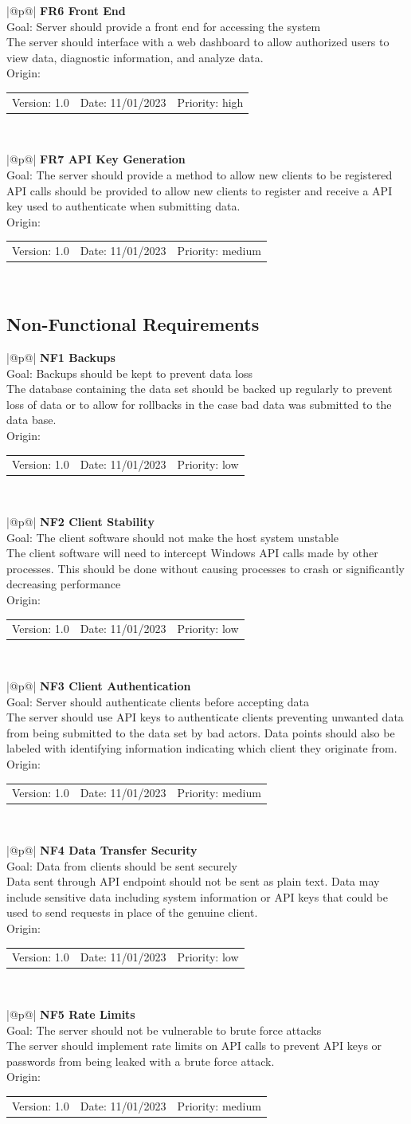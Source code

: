 \documentclass[titlepage]{article}
\makeatletter
\newcommand{\requirement}[7]
{
        \begin{table}[H]
            \centering
            \begin{tabular}{|@{}p{\textwidth}@{}|}
                \hline
                \textbf{#1} \\
                \hline
                Goal: #2 \\
                \hline
                #3 \\
                \hline
                Origin: #4 \\
                \hline
                \begin{tabular}{c|c|c}
                    Version: #5 & Date: #6 & Priority: #7\\
                \end{tabular}\\
            \hline
            \end{tabular}
        \end{table}
}
\makeatother
\begin{document}
\requirement
{FR6 Front End}
{Server should provide a front end for accessing the system}
{The server should interface with a web dashboard to allow authorized users to view data, diagnostic information, and analyze data.}
{}{1.0}{11/01/2023}{high}

\requirement
{FR7 API Key Generation}
{The server should provide a method to allow new clients to be registered}
{API calls should be provided to allow new clients to register and receive a API key used to authenticate when submitting data.}
{}{1.0}{11/01/2023}{medium}

\subsection{Non-Functional Requirements}
\requirement
{NF1 Backups}
{Backups should be kept to prevent data loss}
{The database containing the data set should be backed up regularly to prevent loss of data or to allow for rollbacks in the case bad data was submitted to the data base.}
{}{1.0}{11/01/2023}{low}
\requirement
{NF2 Client Stability}
{The client software should not make the host system unstable}
{The client software will need to intercept Windows API calls made by other processes. This should be done without causing processes to crash or significantly decreasing performance}
{}{1.0}{11/01/2023}{low}

\requirement
{NF3 Client Authentication}
{Server should authenticate clients before accepting data}
{The server should use API keys to authenticate clients preventing unwanted data from being submitted to the data set by bad actors. Data points should also be labeled with identifying information indicating which client they originate from.}
{}{1.0}{11/01/2023}{medium}

\requirement
{NF4 Data Transfer Security}
{Data from clients should be sent securely}
{Data sent through API endpoint should not be sent as plain text. Data may include sensitive data including system information or API keys that could be used to send requests in place of the genuine client. }
{}{1.0}{11/01/2023}{low}

\requirement
{NF5 Rate Limits}
{The server should not be vulnerable to brute force attacks}
{The server should implement rate limits on API calls to prevent API keys or passwords from being leaked with a brute force attack. }
{}{1.0}{11/01/2023}{medium}
\end{document}
